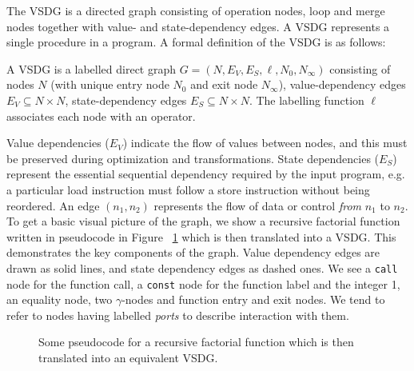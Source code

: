 The VSDG is a directed graph consisting of operation nodes, loop and merge nodes together with value- and state-dependency edges. A VSDG represents a single procedure in a program. A formal definition of the VSDG is as follows:

\begin{definition}
A VSDG is a labelled direct graph $G=(N,E_{V},E_{S},\ell,N_{0},N_{\infty})$ consisting of nodes $N$ (with unique entry node $N_{0}$ and exit node $N_{\infty}$), value-dependency edges $E_{V}\subseteq N\times N$, state-dependency edges $E_{S}\subseteq N \times N$. The labelling function $\ell$ associates each node with an operator.
\end{definition}

Value dependencies ($E_{V}$) indicate the flow of values between nodes, and this must be preserved during optimization and transformations. State dependencies ($E_{S}$) represent  the essential sequential dependency required by the input program, e.g. a particular load instruction must follow a store instruction without being reordered. An edge $(n_{1},n_{2})$ represents the flow of data or control \textit{from} $n_{1}$ to $n_{2}$. To get a basic visual picture of the graph, we show a recursive factorial function written in pseudocode in Figure ~\ref{fig: vsdg-fac} which is then translated into a VSDG. This demonstrates the key components of the graph. Value dependency edges are drawn as solid lines, and state dependency edges as dashed ones. We see a \texttt{call} node for the function call, a \texttt{const} node for the function label and the integer 1, an equality node, two $\gamma$-nodes and function entry and exit nodes. We tend to refer to nodes having labelled \textit{ports} to describe interaction with them.

\begin{figure}[ht]
\centering
{}
\caption{Some pseudocode for a recursive factorial function which is then translated into an equivalent VSDG.}
\label{fig: vsdg-fac}
\end{figure}

